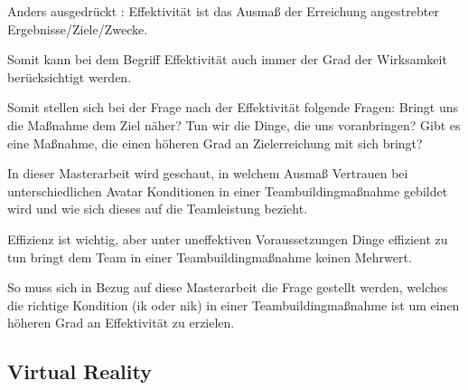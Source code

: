 \documentclass[a4paper,11pt]{article}%
\renewcommand{\\}{\vspace*{0.5\baselineskip} \newline}
\begin{document}
Anders ausgedrückt : Effektivität ist das Ausmaß der Erreichung angestrebter Ergebnisse/Ziele/Zwecke.

Somit kann bei dem Begriff \dq{}Effektivität\dq{} auch immer der Grad der Wirksamkeit berücksichtigt werden.

Somit stellen sich bei der Frage nach der Effektivität folgende Fragen: 
Bringt uns die Maßnahme dem Ziel näher? 
Tun wir die Dinge, die uns voranbringen?
Gibt es eine Maßnahme, die einen höheren Grad an Zielerreichung mit sich bringt?

In dieser Masterarbeit wird geschaut, in welchem Ausmaß Vertrauen bei unterschiedlichen Avatar Konditionen in einer Teambuildingmaßnahme gebildet wird und wie sich dieses auf die Teamleistung bezieht.

Effizienz ist wichtig, aber unter uneffektiven Voraussetzungen Dinge effizient zu tun bringt dem Team in einer Teambuildingmaßnahme keinen Mehrwert.

So muss sich in Bezug auf diese Masterarbeit die Frage gestellt werden, welches die richtige Kondition (\ac{ik} oder \ac{nik}) in einer Teambuildingmaßnahme ist um einen höheren Grad an Effektivität zu erzielen.
	\subsection{Virtual Reality}
	\label{Virtual Reality}
\end{document}
